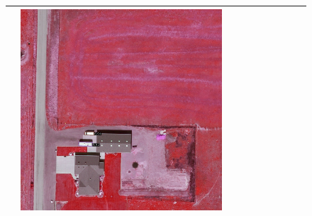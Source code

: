 \begin{figure}[H]
\begin{tabularx}{\textwidth}{c|*{9}{X}}
    & \includegraphics[trim={300pt 355pt 610pt 570pt},clip,width=\linewidth]{images/015Results/02perm_exp/comp_images/rirb/198.png} \\ \hline


\end{tabularx}
\end{figure}
